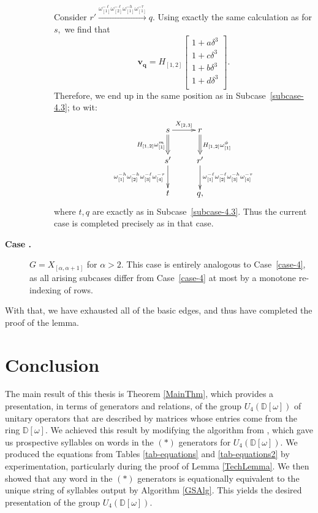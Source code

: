 \documentclass{dalthesis}
\theoremstyle{theorem}
\theoremstyle{definition}
\theoremstyle{definition}  %
\theoremstyle{definition}
\newcommand{\D}{\mathbb{D}}
\renewcommand{\:}{\mathbin{:}}
\newcommand{\edge}{\xrightarrow}
\newcounter{casecounter}
\renewcommand{\thecasecounter}{\arabic{casecounter}}
\def\case{\refstepcounter{casecounter}\item[{\bf Case \thecasecounter.}]}
\begin{document}
\begin{description}
\begin{description}
Consider $r'\edge{\omega^{-\ell}_{[1]}\omega^{-\ell}_{[2]}\omega^{-h}_{[1]}\omega^{-\tau}_{[1]}}q.$ Using exactly the same calculation as for $s,$ we find that \[
\boldsymbol{v_q} = H_{[1,2]}\begin{bmatrix}
1+a\delta^3\\
1+c\delta^3\\
1+b\delta^3\\
1+d\delta^3\\
\end{bmatrix}.
\]
Therefore, we end up in the same position as in Subcase~\ref{subcase-4.3}; to wit:\[ \xymatrix{
        s \ar@{=>}[d]_{H_{[1,2]}\omega^m_{[1]}} \ar[r]^{X_{[2,3]}} &
        r \ar@{=>}[d]^{H_{[1,2]}\omega^\phi_{[1]}} \\
        s' \ar@{->}[d]_{\omega^{-h}_{[1]}\omega^{-h}_{[2]}\omega^{-\ell}_{[3]}\omega^{-\tau}_{[4]}} &
        r' \ar@{->}[d]^{\omega^{-\ell}_{[1]}\omega^{-\ell}_{[2]}\omega^{-h}_{[3]}\omega^{-\tau}_{[4]}} \\
        t&
        q,
      }
      \]
      where $t,q$ are exactly as in Subcase~\ref{subcase-4.3}. Thus the current case is completed precisely as in that case.
\end{description}      
  \case\label{case-5} $G = X_{[\alpha,\alpha+1]}$ for $\alpha > 2.$ This case is entirely analogous to Case~\ref{case-4}, as all arising subcases differ from Case~\ref{case-4} at most by a monotone re-indexing of rows.
  
  \end{description}
  
  With that, we have exhausted all of the basic edges, and thus have completed the proof of the lemma.

\chapter{Conclusion}

The main result of this thesis is Theorem \ref{MainThm}, which provides a presentation, in terms of generators and relations, of the group $U_4(\D[\omega])$ of unitary operators that are described by matrices whose entries come from the ring $\D[\omega].$ We achieved this result by modifying the algorithm from \cite{GILES-SEL}, which gave us prospective syllables on words in the $(*)$ generators for $U_4(\D[\omega]).$ We produced the equations from Tables \ref{tab-equations} and \ref{tab-equations2} by experimentation, particularly during the proof of Lemma \ref{TechLemma}. We then showed that any word in the $(*)$ generators is equationally equivalent to the unique string of syllables output by Algorithm \ref{GSAlg}. This yields the desired presentation of the group $U_4(\D[\omega])$.
\end{document}
